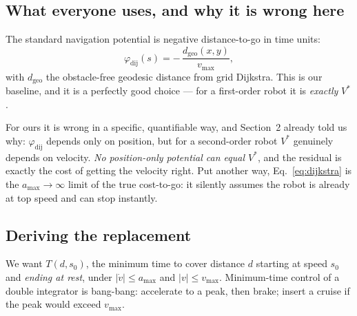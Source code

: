 \documentclass[11pt,a4paper]{article}
\begin{document}
\subsection{What everyone uses, and why it is wrong here}

The standard navigation potential is negative distance-to-go in time units:
\begin{equation}
\label{eq:dijkstra}
\varphi_{\text{dij}}(s) = -\,\frac{d_{\text{geo}}(x,y)}{v_{\max}},
\end{equation}
with $d_{\text{geo}}$ the obstacle-free geodesic distance from grid Dijkstra. This is our
baseline, and it is a perfectly good choice --- for a first-order robot it is
\emph{exactly} $V^*$.

For ours it is wrong in a specific, quantifiable way, and Section~2 already told us why:
$\varphi_{\text{dij}}$ depends only on position, but for a second-order robot $V^*$ genuinely
depends on velocity. \emph{No position-only potential can equal $V^*$}, and the residual is
exactly the cost of getting the velocity right. Put another way,
Eq.~\ref{eq:dijkstra} is the $a_{\max}\to\infty$ limit of the true cost-to-go: it silently
assumes the robot is already at top speed and can stop instantly.

\subsection{Deriving the replacement}

We want $T(d, s_0)$, the minimum time to cover distance $d$ starting at speed $s_0$ and
\emph{ending at rest}, under $|\dot v|\le a_{\max}$ and $|v|\le v_{\max}$. Minimum-time
control of a double integrator is bang-bang: accelerate to a peak, then brake; insert a
cruise if the peak would exceed $v_{\max}$.
\end{document}
